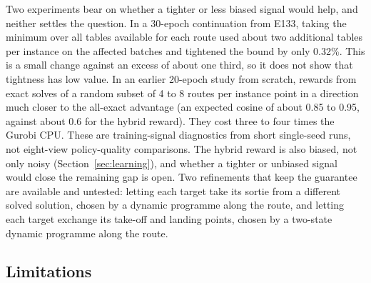 \documentclass[preprint,12pt,authoryear]{elsarticle}
\begin{document}
Two experiments bear on whether a tighter or less biased signal would help, and neither settles the question. In a 30-epoch continuation from E133, taking the minimum over all tables available for each route used about two additional tables per instance on the affected batches and tightened the bound by only 0.32\%. This is a small change against an excess of about one third, so it does not show that tightness has low value. In an earlier 20-epoch study from scratch, rewards from exact solves of a random subset of 4 to 8 routes per instance point in a direction much closer to the all-exact advantage (an expected cosine of about 0.85 to 0.95, against about 0.6 for the hybrid reward). They cost three to four times the Gurobi CPU. These are training-signal diagnostics from short single-seed runs, not eight-view policy-quality comparisons. The hybrid reward is also biased, not only noisy (Section~\ref{sec:learning}), and whether a tighter or unbiased signal would close the remaining gap is open. Two refinements that keep the guarantee are available and untested: letting each target take its sortie from a different solved solution, chosen by a dynamic programme along the route, and letting each target exchange its take-off and landing points, chosen by a two-state dynamic programme along the route.

\subsection{Limitations}
\label{sec:limits}
\end{document}
